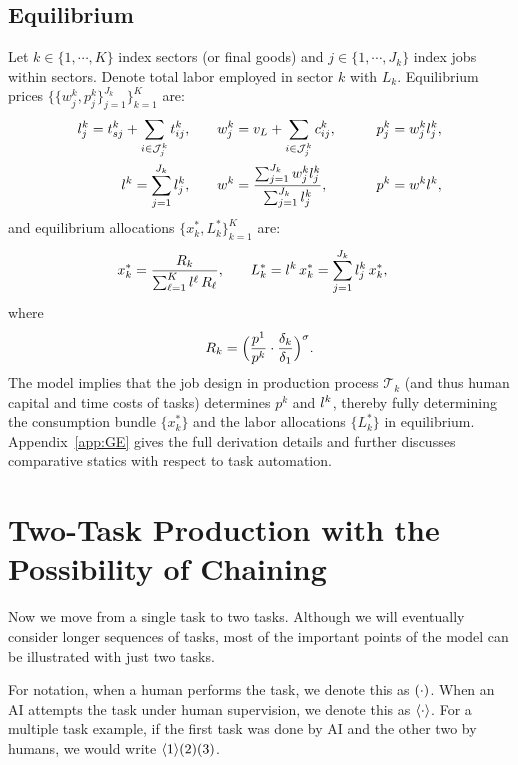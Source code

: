 \documentclass{article}
\theoremstyle{plain}
\theoremstyle{plain}
\begin{document}
\subsection{Equilibrium}
Let $k \in \{1, \cdots, K\}$ index sectors (or final goods) and $j \in \{1,\cdots, J_k \}$ index jobs within sectors.
Denote total labor employed in sector $k$ with $L_k$.
Equilibrium prices $\big\{ \big\{ w_j^k, p_j^k \big\}_{j=1}^{J_k} \big\}_{k=1}^K$ are: 
\begin{align*}
l_{j}^k =  t_{sj}^k + \sum_{i \in \mathcal{J}_j^k} t_{ij}^{k},
& \qquad
w_j^k =  v_L + \sum_{i \in \mathcal{J}_j^k} c_{ij}^{k}, 
& \qquad
p_j^k = w_j^k l_{j}^k, \\
l_{}^k = \sum_{j=1}^{J_k} l_{j}^k,
& \qquad
w^k = \frac{\sum_{j=1}^{J_k} w_j^k l_{j}^k}{\sum_{j=1}^{J_k} l_{j}^k},
& \qquad
p^k = w^k l_{}^k,
\end{align*}
and equilibrium allocations $\big\{ x_k^*, L_k^* \big\}_{k=1}^K$ are:
\begin{align*}
x_k^* = \frac{R_k}{\sum_{\ell=1}^K l_{}^\ell\,R_\ell},
& \qquad
L_k^* = l_{}^k\,x_k^* = \sum_{j=1}^{J_k} l_{j}^k\,x_k^*,
\end{align*}
where
\[
R_k = \Bigl(\frac{p^1}{p^k} \cdot \frac{\delta_k}{\delta_1}\Bigr)^{\sigma}.
\]
The model implies that the job design in production process $\mathcal{T}_k$ (and thus human capital and time costs of tasks) determines $p^k$ and $l_{}^k$, thereby fully determining the consumption bundle $\{x_k^*\}$ and the labor allocations $\{L_k^*\}$ in equilibrium.
Appendix~\ref{app:GE} gives the full derivation details and further discusses comparative statics with respect to task automation.



\section{Two-Task Production with the Possibility of Chaining}
Now we move from a single task to two tasks.  
Although we will eventually consider longer sequences of tasks, most of the important points of the model can be illustrated with just two tasks.

For notation, when a human performs the task, we denote this as $( \cdot )$.
When an AI attempts the task under human supervision, we denote this as $\langle \cdot \rangle$.
For a multiple task example, if the first task was done by AI and the other two by humans, we would write $\langle 1 \rangle( 2 )( 3 )$.
\end{document}
